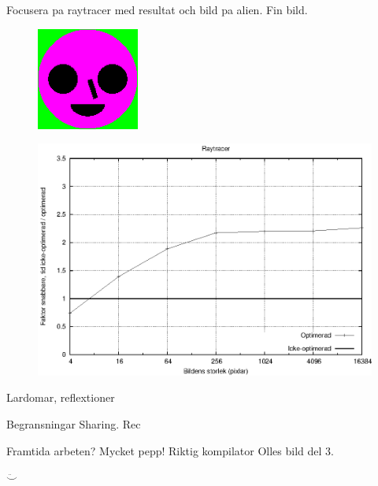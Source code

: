 \documentclass{beamer}
\begin{document}
\begin{frame}
	Focusera pa raytracer med resultat och bild pa alien.
	Fin bild.

\begin{figure}[H]
\centering
    \includegraphics[width=0.3\textwidth]{img/shapes.png} 
\end{figure}


\end{frame}
\begin{frame}
\begin{figure}[H]
\includegraphics[width=1\textwidth]{shapesnormnocb.eps}
\end{figure}


\end{frame}

\begin{frame}

	Lardomar, reflextioner

\end{frame}

\begin{frame}
	Begransningar 
	Sharing. Rec	
\end{frame} 

\begin{frame}
	Framtida arbeten?
	Mycket pepp!
	Riktig kompilator
	Olles bild del 3.
	
	$\ddot\smile$ 
\end{frame}
\end{document}
